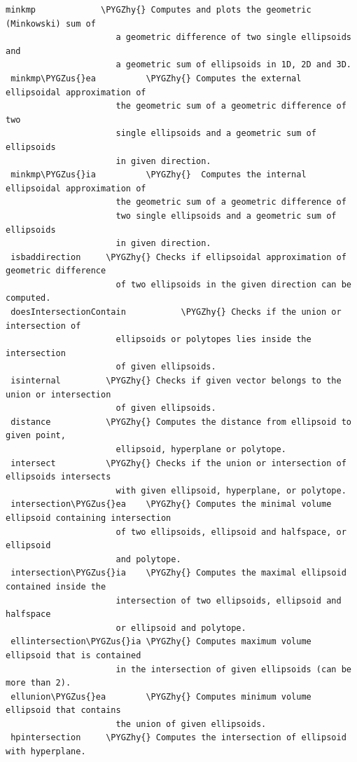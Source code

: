 \documentclass[letterpaper,10pt,english]{sphinxmanual}
\def\PYGZus{\char`\_}
\def\PYGZhy{\char`\-}
\begin{document}
\begin{Verbatim}[commandchars=\\\{\}]
 minkmp             \PYGZhy{} Computes and plots the geometric (Minkowski) sum of
                      a geometric difference of two single ellipsoids and
                      a geometric sum of ellipsoids in 1D, 2D and 3D.
 minkmp\PYGZus{}ea          \PYGZhy{} Computes the external ellipsoidal approximation of
                      the geometric sum of a geometric difference of two
                      single ellipsoids and a geometric sum of ellipsoids
                      in given direction.
 minkmp\PYGZus{}ia          \PYGZhy{}  Computes the internal ellipsoidal approximation of
                      the geometric sum of a geometric difference of
                      two single ellipsoids and a geometric sum of ellipsoids
                      in given direction.
 isbaddirection     \PYGZhy{} Checks if ellipsoidal approximation of geometric difference
                      of two ellipsoids in the given direction can be computed.
 doesIntersectionContain           \PYGZhy{} Checks if the union or intersection of
                      ellipsoids or polytopes lies inside the intersection
                      of given ellipsoids.
 isinternal         \PYGZhy{} Checks if given vector belongs to the union or intersection
                      of given ellipsoids.
 distance           \PYGZhy{} Computes the distance from ellipsoid to given point,
                      ellipsoid, hyperplane or polytope.
 intersect          \PYGZhy{} Checks if the union or intersection of ellipsoids intersects
                      with given ellipsoid, hyperplane, or polytope.
 intersection\PYGZus{}ea    \PYGZhy{} Computes the minimal volume ellipsoid containing intersection
                      of two ellipsoids, ellipsoid and halfspace, or ellipsoid
                      and polytope.
 intersection\PYGZus{}ia    \PYGZhy{} Computes the maximal ellipsoid contained inside the
                      intersection of two ellipsoids, ellipsoid and halfspace
                      or ellipsoid and polytope.
 ellintersection\PYGZus{}ia \PYGZhy{} Computes maximum volume ellipsoid that is contained
                      in the intersection of given ellipsoids (can be more than 2).
 ellunion\PYGZus{}ea        \PYGZhy{} Computes minimum volume ellipsoid that contains
                      the union of given ellipsoids.
 hpintersection     \PYGZhy{} Computes the intersection of ellipsoid with hyperplane.
\end{Verbatim}
\end{document}
